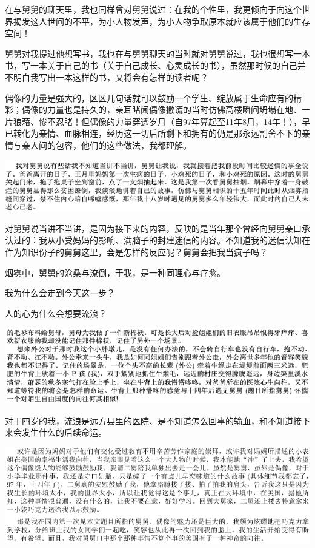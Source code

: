 \documentclass[9pt, b5paper]{article}
\begin{document}
在与舅舅的聊天里，我也同样曾对舅舅说过：在我的个性里，我更倾向于向这个世界揭发这人世间的不平，为小人物发声，为小人物争取原本就应该属于他们的生存空间！

舅舅对我提过他想写书，我也在与舅舅聊天的当时就对舅舅说过，我也很想写一本书，写一本关于自己的书（关于自己成长、心灵成长的书），虽然那时候的自己并不明白我写出一本这样的书，又将会有怎样的读者呢？

偶像的力量是强大的，区区几句话就可以鼓励一个学生、绽放属于生命应有的精彩；偶像的力量也是持久的，亲耳睹闻偶像撒谎的当时仿佛高楼瞬间坍塌在地、一片狼藉、惨不忍睹！但偶像的力量穿透岁月（自97年算起至11年8月，14年！），早已转化为亲情、血脉相连，经历这一切后所剩下和拥有的仍是那永远割舍不下的亲情与亲人间的包容，他们的这些做法，我都理解。

\begin{center}
\includegraphics[width=.9\linewidth]{./pic/p1p121-2.png}
\end{center}

对舅舅说当讲不当讲，是因为接下来的内容，反映的是当年那个曾经向舅舅亲口承认过的：我从小受妈妈的影响、满脑子的封建迷信的内容。不知道我的迷信认知在作为知识份子的舅舅这里，会是怎样的反应呢？舅舅会把我当疯子吗？

烟雾中，舅舅的沧桑与潦倒，于我，是一种同理心与疗愈。

我为什么会走到今天这一步？

人的心为什么会想要流浪？

\begin{center}
\includegraphics[width=.9\linewidth]{./pic/p1p82.png}
\end{center}

对于四岁的我，流浪是远方县里的医院、是不知道怎么回事的输血，和不知道接下来会发生什么的后续命运。

\begin{center}
\includegraphics[width=.9\linewidth]{./pic/p1p21.png}
\end{center}
\end{document}
